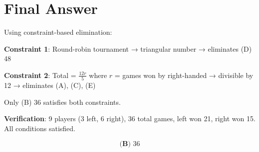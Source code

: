 \documentclass[12pt]{article}
\begin{document}
\section*{Final Answer}

Using constraint-based elimination:

\textbf{Constraint 1}: Round-robin tournament → triangular number → eliminates (D) 48

\textbf{Constraint 2}: Total = $\frac{12r}{5}$ where $r$ = games won by right-handed → divisible by 12 → eliminates (A), (C), (E)

Only (B) 36 satisfies both constraints.

\textbf{Verification}: 9 players (3 left, 6 right), 36 total games, left won 21, right won 15. All conditions satisfied.

$$\boxed{\textbf{(B) } 36}$$
\end{document}
